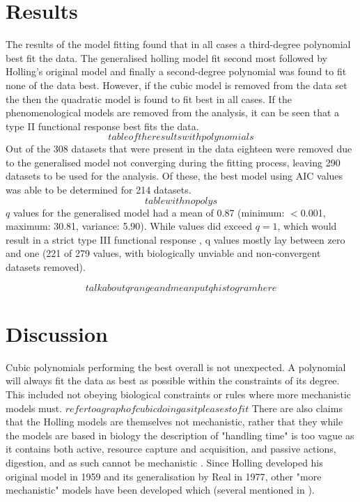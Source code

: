 \documentclass[a4paper]{article}
\numberwithin{equation}{section}
\begin{document}
\section{Results}
The results of the model fitting found that in all cases a third-degree polynomial best fit the data.  The generalised holling model fit second most followed by Holling's original model and finally a second-degree polynomial was found to fit none of the data best.  However, if the cubic model is removed from the data set the then the quadratic model is found to fit best in all cases. If the phenomenological models are removed from the analysis, it can be seen that a type II functional response best fits the data.
$$ 
table of the results with polynomials
$$  
\newline
Out of the 308 datasets that were present in the data eighteen were removed due to the generalised model not converging during the fitting process, leaving 290 datasets to be used for the analysis.  Of these, the best model using AIC values was able to be determined for 214 datasets.  
$$
table with no polys
$$
\newline
$q$ values for the generalised model had a mean of 0.87 (minimum: $<$0.001, maximum: 30.81, variance: 5.90).  While values did exceed $q=1$, which would result in a strict type III functional response \cite{Rosenbaum2018}, q values mostly lay between zero and one (221 of 279 values, with biologically unviable and non-convergent datasets removed).

$$
talk about q range and mean
put q histogram here
$$

\newpage
\section{Discussion}
Cubic polynomials performing the best overall is not unexpected.  A polynomial will always fit the data as best as possible within the constraints of its degree.  This included not obeying biological constraints or rules where more mechanistic models must. $refer to a graph of cubic doing as it pleases to fit$
There are also claims that the Holling models are themselves not mechanistic, rather that they while the models are based in biology the description of "handling time" is too vague as it contains both active, resource capture and acquisition, and passive actions, digestion, and as such cannot be mechanistic \cite{Jeschke2002a}.  Since Holling developed his original model in 1959\cite{Holling1959} and its generalisation by Real in 1977\cite{Real1977}, other "more mechanistic" models have been developed which \cite{Jeschke2002a} (several mentioned in \cite{Rosenbaum2018}).  
\newline
\end{document}
